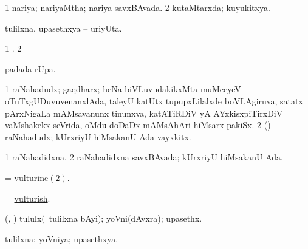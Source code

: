 \bentry
{} 
\gl{\gu}
\expl{}
\bmng
\bnum
\num{1} nariya; nariyaMtha; nariya savxBAvada. 
\num{2} kutaMtarxda; kuyukitxya. 
\enum
\emng
\eentry 

\bentry
{} 
\gl{\nA}
\expl{}
\bmng
 tulilxna, upasethxya -- uriyUta. 
\emng
\eentry

\bentry
{}
\gl{\saMkiSx}
\expl{}
\bmng
\bnum
\num{1} . 
\num{2}  
\enum
\emng
\eentry

\bentry
{} 
\gl{\kirx}
\expl{}
\bmng
  padada \vakaq rUpa. 
\emng
\eentry

\bentry
{} 
\gl{\nA}
\bmng
\bnum
\num{1} raNahadudx; gaqdharx; heNa biVLuvudakikxMta muMceyeV oTuTxgUDuvuvenanxlAda, taleyU katUtx tupupxLilalxde boVLAgiruva, satatx pArxNigaLa mAMsavanunx tinunxva, katATiRDiV yA AYxkisxpiTirxDiV vaMshakekx seVrida, oMdu doDaDx mAMsAhAri hiMsarx pakiSx.  
\num{2} (\rUpa) raNahadudx; kUrxriyU hiMsakanU Ada vayxkitx. 
\enum
\emng
\eentry

\bentry
{} 
\gl{\gu}
\expl{}
\bmng
\bnum
\num{1} raNahadidxna. 
\hypertarget{vulturine(2)}{} 
\num{2} raNahadidxna savxBAvada; kUrxriyU hiMsakanU Ada. 
\enum
\emng
\eentry

\bentry
{} 
\gl{\gu}
\expl{}
\bmng
 = \hyperlink{vulturine(2)}{vulturine\((2)\)}. 
\emng
\eentry

\bentry
{} 
\gl{\gu}
\expl{}
\bmng
 = \hyperlink{vulturish}{vulturish}. 
\emng
\eentry

\bentry
{} 
\gl{\nA}
\bmng
 (\aMrashA, \pArxvi) tululx(\kanmu\ tulilxna bAyi); yoVni(dAvxra); upasethx. 
\emng
\eentry

\bentry
{} 
\gl{\gu}
\expl{}
\bmng
 tulilxna; yoVniya; upasethxya. 
\emng
\eentry

%
